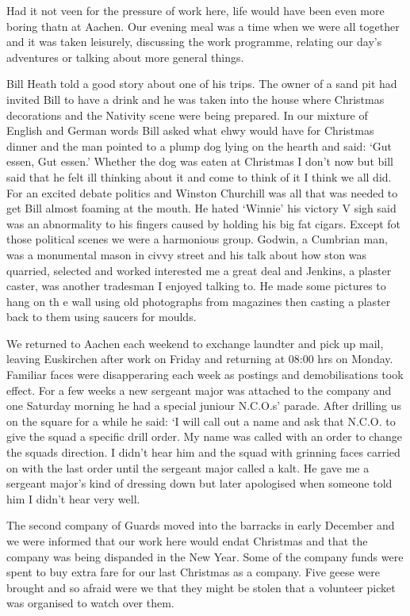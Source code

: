 Had it not veen for the pressure of work here, life would have been
even more boring thatn at Aachen. Our evening meal was a time when we
were all together and it was taken leisurely, discussing the work
programme, relating our day's adventures or talking about more general
things.

\Sapper Bill Heath told a good story about one of his trips. The owner
of a sand pit had invited Bill to have a drink and he was taken into
the house where Christmas decorations and the Nativity scene were
being prepared. In our mixture of English and German words Bill asked
what ehwy would have for Christmas dinner and the man pointed to a
plump dog lying on the hearth and said: `Gut essen, Gut essen.'
Whether the dog was eaten at Christmas I don't now but bill said that
he felt ill thinking about it and come to think of it I think we all
did. For an excited debate politics and Winston Churchill was all that
was needed to get Bill almost foaming at the mouth. He hated `Winnie'
his victory V sigh said was an abnormality to his fingers caused by
holding his big fat cigars. Except fot those political scenes we were
a harmonious group. \Sapper Godwin, a Cumbrian man, was a monumental
mason in civvy street and his talk about how ston was quarried,
selected and worked interested me a great deal and \sapper Jenkins, a
plaster caster, was another tradesman I enjoyed talking to. He made
some pictures to hang on th e wall using old photographs from
magazines then casting a plaster back to them using saucers for
moulds.

We returned to Aachen each weekend to exchange laundter and pick up
mail, leaving Euskirchen after work on Friday and returning at 08:00
hrs on Monday. Familiar faces were disapperaring each week as postings
and demobilisations took effect. For a few weeks a new sergeant major
was attached to the company and one Saturday morning he had a special
juniour N.C.O.s' parade. After drilling us on the square for a while
he said: `I will call out a name and ask that N.C.O. to give the squad
a specific drill order. My name was called with an order to change the
squads direction. I didn't hear him and the squad with grinning faces
carried on with the last order until the sergeant major called a
kalt. He gave me a sergeant major's kind of dressing down but later
apologised when someone told him I didn't hear very well.

The second company of Guards moved into the barracks in early December
and we were informed that our work here would endat Christmas and that
the company was being dispanded in the New Year. Some of the company
funds were spent to buy extra fare for our last Christmas as a
company. Five geese were brought and so afraid were we that they might
be stolen that a volunteer picket was organised to watch over them.

